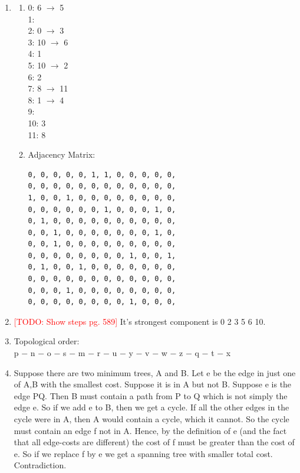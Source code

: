 \documentclass[11pt,fleqn]{article}
\newcommand\todo[1]{\textcolor{red}{[TODO: #1]}}
\begin{document}
\begin{enumerate}
	\item 
		\begin{enumerate}
			\item
0: 6 $\rightarrow$ 5 \\
1: \\
2: 0 $\rightarrow$ 3 \\
3: 10 $\rightarrow$ 6 \\
4: 1 \\
5: 10 $\rightarrow$ 2 \\
6: 2 \\
7: 8 $\rightarrow$ 11 \\
8: 1 $\rightarrow$ 4 \\
9: \\
10: 3 \\
11: 8
			\item Adjacency Matrix:
\begin{verbatim}
0, 0, 0, 0, 0, 1, 1, 0, 0, 0, 0, 0, 
0, 0, 0, 0, 0, 0, 0, 0, 0, 0, 0, 0, 
1, 0, 0, 1, 0, 0, 0, 0, 0, 0, 0, 0, 
0, 0, 0, 0, 0, 0, 1, 0, 0, 0, 1, 0, 
0, 1, 0, 0, 0, 0, 0, 0, 0, 0, 0, 0, 
0, 0, 1, 0, 0, 0, 0, 0, 0, 0, 1, 0, 
0, 0, 1, 0, 0, 0, 0, 0, 0, 0, 0, 0, 
0, 0, 0, 0, 0, 0, 0, 0, 1, 0, 0, 1, 
0, 1, 0, 0, 1, 0, 0, 0, 0, 0, 0, 0, 
0, 0, 0, 0, 0, 0, 0, 0, 0, 0, 0, 0, 
0, 0, 0, 1, 0, 0, 0, 0, 0, 0, 0, 0, 
0, 0, 0, 0, 0, 0, 0, 0, 1, 0, 0, 0, 
\end{verbatim}
		\end{enumerate}

	\item \todo{Show steps pg. 589}
It's strongest component is 0 2 3 5 6 10.

	\item Topological order: \\
p $-$ n $-$ o $-$ s $-$ m $-$ r $-$ u $-$ y $-$ v $-$ w $-$ z $-$ q $-$ t $-$ x 

\newpage

	\item Suppose there are two minimum trees, A and B. Let e be the edge in just one of A,B with the smallest cost. 
Suppose it is in A but not B. Suppose e is the edge PQ. Then B must contain a path from P to Q which is not simply the edge e. 
So if we add e to B, then we get a cycle. If all the other edges in the cycle were in A, then A would contain a cycle, which it cannot. 
So the cycle must contain an edge f not in A. Hence, by the definition of e (and the fact that all edge-costs are different) the cost of f must be greater than the cost of e. 
So if we replace f by e we get a spanning tree with smaller total cost. Contradiction.


\end{enumerate}
\end{document}
